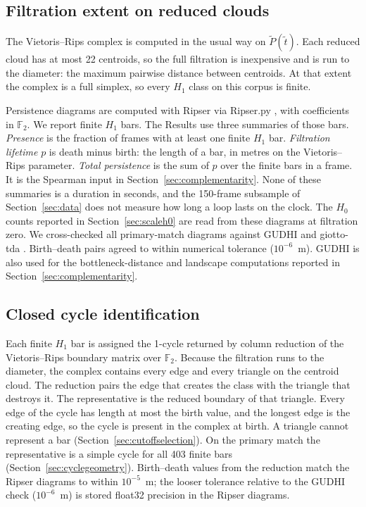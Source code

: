 \subsection{Filtration extent on reduced clouds}
\label{sec:filtrationextent}

The Vietoris--Rips complex is computed in the usual way on
$\tilde{P}(\tilde{t})$. Each reduced cloud has at most 22 centroids,
so the full filtration is inexpensive and is run to the diameter: the
maximum pairwise distance between centroids. At that extent the
complex is a full simplex, so every $H_1$ class on this corpus is
finite.

Persistence diagrams are computed with Ripser via Ripser.py
\citep{bauer2021ripser}, with coefficients in $\mathbb{F}_2$. We report
finite $H_1$ bars. The Results use three summaries of those bars.
\emph{Presence} is the fraction of frames with at least one finite
$H_1$ bar. \emph{Filtration lifetime} $p$ is death minus birth: the
length of a bar, in metres on the Vietoris--Rips parameter.
\emph{Total persistence} is the sum of $p$ over the finite bars in a
frame. It is the Spearman input in
Section~\ref{sec:complementarity}. None of these summaries is a
duration in seconds, and the 150-frame subsample of
Section~\ref{sec:data} does not measure how long a loop lasts on the
clock. The $H_0$ counts reported in
Section~\ref{sec:scaleh0} are read from these diagrams at filtration
zero. We cross-checked all
primary-match diagrams against GUDHI \citep{gudhi2014} and giotto-tda
\citep{tauzin2021}. Birth--death pairs agreed to within numerical
tolerance ($10^{-6}$~m). GUDHI is also used for the bottleneck-distance
and landscape computations reported in
Section~\ref{sec:complementarity}.

\subsection{Closed cycle identification}
\label{sec:cycles}

Each finite $H_1$ bar is assigned the 1-cycle returned by column
reduction of the Vietoris--Rips boundary matrix over $\mathbb{F}_2$.
Because the filtration runs to the diameter, the complex contains
every edge and every triangle on the centroid cloud. The reduction
pairs the edge that creates the class with the triangle that destroys
it. The representative is the reduced boundary of that triangle. Every
edge of the cycle has length at most the birth value, and the longest
edge is the creating edge, so the cycle is present in the complex at
birth. A triangle cannot represent a bar
(Section~\ref{sec:cutoffselection}). On the primary match the
representative is a simple cycle for all 403 finite bars
(Section~\ref{sec:cyclegeometry}). Birth--death values from the
reduction match the Ripser diagrams to within $10^{-5}$~m; the looser
tolerance relative to the GUDHI check ($10^{-6}$~m) is stored
float32 precision in the Ripser diagrams.

